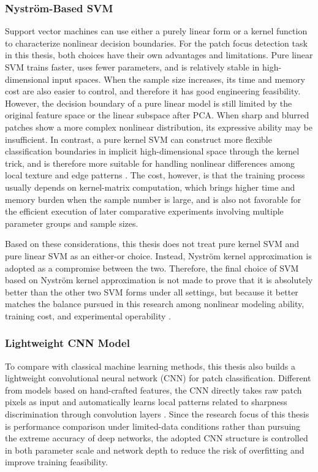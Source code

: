 \subsubsection{Nystr\"{o}m-Based SVM}
\par Support vector machines can use
either a purely linear form or a kernel function to characterize nonlinear
decision boundaries. For the patch focus detection task in this thesis, both
choices have their own advantages and limitations. Pure linear SVM trains
faster, uses fewer parameters, and is relatively stable in high-dimensional
input spaces. When the sample size increases, its time and memory cost are also
easier to control, and therefore it has good engineering feasibility. However,
the decision boundary of a pure linear model is still limited by the original
feature space or the linear subspace after PCA. When sharp and blurred patches
show a more complex nonlinear distribution, its expressive ability may be
insufficient. In contrast, a pure kernel SVM can construct more flexible
classification boundaries in implicit high-dimensional space through the kernel
trick, and is therefore more suitable for handling nonlinear differences among
local texture and edge patterns \cite{cortes1995support,scholkopf2002learning}.
The cost, however, is that the training process usually depends on kernel-matrix
computation, which brings higher time and memory burden when the sample number
is large, and is also not favorable for the efficient execution of later
comparative experiments involving multiple parameter groups and sample sizes.

\par Based on these considerations, this thesis does not treat pure kernel SVM
and pure linear SVM as an either-or choice. Instead, Nystr\"{o}m kernel
approximation is adopted as a compromise between the two. Therefore, the final
choice of SVM based on Nystr\"{o}m kernel approximation is not made to prove
that it is absolutely better than the other two SVM forms under all settings,
but because it better matches the balance pursued in this research among
nonlinear modeling ability, training cost, and experimental operability
\cite{williams2001using}.

\subsubsection{Lightweight CNN Model}
\par To compare with classical machine learning methods, this thesis also builds
a lightweight convolutional neural network (CNN) for patch classification.
Different from models based on hand-crafted features, the CNN directly takes raw
patch pixels as input and automatically learns local patterns related to
sharpness discrimination through convolution layers
\cite{lecun2002gradient,krizhevsky2012imagenet}. Since the research focus of
this thesis is performance comparison under limited-data conditions rather than
pursuing the extreme accuracy of deep networks, the adopted CNN structure is
controlled in both parameter scale and network depth to reduce the risk of
overfitting and improve training feasibility.

